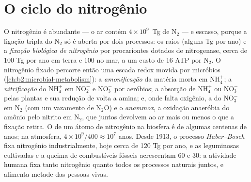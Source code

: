 \section{O ciclo do nitrogênio}

\begin{proposition}\label{prop:b2:biogeochemical-cycles:nitrogen}
O nitrogênio é abundante --- o ar contém $4\times 10^{9}$~Tg de
$\mathrm{N_2}$ --- e escasso, porque a ligação tripla do $\mathrm{N_2}$ só é aberta
por dois processos: os raios (alguns Tg por ano) e a
\emph{fixação biológica de nitrogênio} por procariontes dotados de
nitrogenase, cerca de 100 Tg por ano em terra e 100 no mar, a um
custo de 16 ATP por $\mathrm{N_2}$. O nitrogênio fixado percorre então uma
escada redox movida por micróbios (\cref{ch:b2:microbial-metabolism}):
a \emph{amonificação} da matéria morta em $\mathrm{NH_4^{+}}$;
a \emph{nitrificação} do $\mathrm{NH_4^{+}}$ em $\mathrm{NO_2^{-}}$ e $\mathrm{NO_3^{-}}$ por
 aeróbios; a absorção de $\mathrm{NH_4^{+}}$ ou $\mathrm{NO_3^{-}}$ pelas plantas
e sua redução de volta a amina; e, onde falta oxigênio, a
\emph{} do $\mathrm{NO_3^{-}}$ em $\mathrm{N_2}$ (com um vazamento de $\mathrm{N_2O}$)
e o \emph{anammox}, a oxidação anaeróbia do amônio pelo
nitrito em $\mathrm{N_2}$, que juntos devolvem ao ar mais ou menos o que
a fixação retira. O  de um átomo de nitrogênio na
biosfera é de algumas centenas de anos; na atmosfera, $4\times
10^{9}/400 \approx 10^{7}$ anos. Desde 1913, o processo
\emph{Haber--Bosch} fixa nitrogênio industrialmente, hoje cerca de 120
Tg por ano, e as leguminosas cultivadas e a queima de combustíveis
fósseis acrescentam 60 e 30: a atividade humana fixa tanto nitrogênio
quanto todos os processos naturais juntos, e alimenta metade das pessoas
vivas.
\end{proposition}

